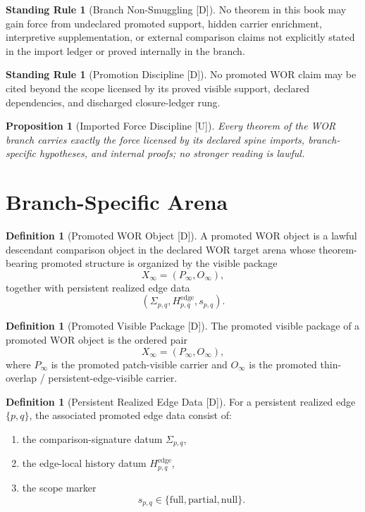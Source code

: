 \documentclass[11pt]{article}
\newtheorem{proposition}[theorem]{Proposition}
\theoremstyle{definition}
\newtheorem{definition}[theorem]{Definition}
\newtheorem{standingrule}[theorem]{Standing Rule}
\theoremstyle{remark}
\newcommand{\U}{\textnormal{[U]}}
\newcommand{\D}{\textnormal{[D]}}
\newcommand{\Pinf}{P_\infty}
\newcommand{\Oinf}{O_\infty}
\newcommand{\Xinf}{X_\infty}
\newcommand{\Sigmaedge}{\Sigma_{p,q}}
\newcommand{\Hedge}{H^{\mathrm{edge}}_{p,q}}
\newcommand{\scopepq}{s_{p,q}}
\begin{document}
\begin{standingrule}[Branch Non-Smuggling {\D}]
No theorem in this book may gain force from undeclared promoted support, hidden carrier enrichment, interpretive supplementation, or external comparison claims not explicitly stated in the import ledger or proved internally in the branch.
\end{standingrule}

\begin{standingrule}[Promotion Discipline {\D}]
No promoted WOR claim may be cited beyond the scope licensed by its proved visible support, declared dependencies, and discharged closure-ledger rung.
\end{standingrule}

\begin{proposition}[Imported Force Discipline {\U}]
Every theorem of the WOR branch carries exactly the force licensed by its declared spine imports, branch-specific hypotheses, and internal proofs; no stronger reading is lawful.
\end{proposition}

\section{Branch-Specific Arena}

\begin{definition}[Promoted WOR Object {\D}]
A promoted WOR object is a lawful descendant comparison object in the declared WOR target arena whose theorem-bearing promoted structure is organized by the visible package
\[
\Xinf=(\Pinf,\Oinf),
\]
together with persistent realized edge data
\[
(\Sigmaedge,\Hedge,\scopepq).
\]
\end{definition}

\begin{definition}[Promoted Visible Package {\D}]
The promoted visible package of a promoted WOR object is the ordered pair
\[
\Xinf=(\Pinf,\Oinf),
\]
where \(\Pinf\) is the promoted patch-visible carrier and \(\Oinf\) is the promoted thin-overlap / persistent-edge-visible carrier.
\end{definition}

\begin{definition}[Persistent Realized Edge Data {\D}]
For a persistent realized edge \(\{p,q\}\), the associated promoted edge data consist of:
\begin{enumerate}[label=(\arabic*)]
    \item the comparison-signature datum \(\Sigmaedge\),
    \item the edge-local history datum \(\Hedge\),
    \item the scope marker
    \[
    \scopepq\in\{\mathrm{full},\mathrm{partial},\mathrm{null}\}.
    \]
\end{enumerate}
\end{definition}
\end{document}
